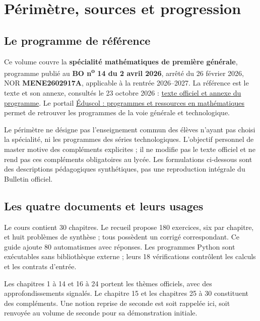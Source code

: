 \documentclass[11pt,a4paper,oneside]{book}
\begin{document}
\frontmatter\tableofcontents\mainmatter
\chapter{Périmètre, sources et progression}
\section{Le programme de référence}
Ce volume couvre la \textbf{spécialité mathématiques de première générale},
programme publié au \textbf{BO n\textsuperscript{o} 14 du 2 avril 2026}, arrêté
du 26 février 2026, NOR \textbf{MENE2602917A}, applicable à la rentrée 2026--2027.
La référence est le texte et son annexe, consultés le 23 octobre 2026 :
\href{https://www.education.gouv.fr/bo/2026/Hebdo14/MENE2602917A}{texte officiel et annexe du programme}.
Le portail
\href{https://eduscol.education.gouv.fr/5817/programmes-et-ressources-en-mathematiques-voie-gt}{Éduscol : programmes et ressources en mathématiques}
permet de retrouver les programmes de la voie générale et technologique.

Le périmètre ne désigne pas l'enseignement commun des élèves n'ayant pas
choisi la spécialité, ni les programmes des séries technologiques.
L'objectif personnel de master motive des compléments explicites ; il ne
modifie pas le texte officiel et ne rend pas ces compléments obligatoires au lycée.
Les formulations ci-dessous sont des descriptions pédagogiques synthétiques,
pas une reproduction intégrale du Bulletin officiel.

\section{Les quatre documents et leurs usages}
Le cours contient 30 chapitres. Le recueil propose 180 exercices, six par
chapitre, et huit problèmes de synthèse ; tous possèdent un corrigé correspondant.
Ce guide ajoute 80 automatismes avec réponses. Les programmes Python sont
exécutables sans bibliothèque externe ; leurs 18 vérifications contrôlent
les calculs et les contrats d'entrée.

Les chapitres 1 à 14 et 16 à 24 portent les thèmes officiels, avec des
approfondissements signalés. Le chapitre 15 et les chapitres 25 à 30 constituent
des compléments. Une notion reprise de seconde est soit rappelée ici, soit
renvoyée au volume de seconde pour sa démonstration initiale.
\end{document}
